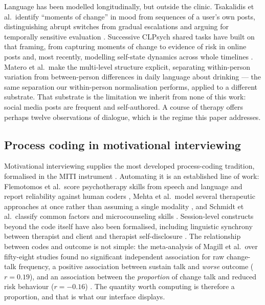 \documentclass[conference]{IEEEtran}
\begin{document}
Language has been modelled longitudinally, but outside the clinic. Tsakalidis
et al.\ identify ``moments of change'' in mood from sequences of a user's own
posts, distinguishing abrupt switches from gradual escalations and arguing for
temporally sensitive evaluation \cite{tsakalidis2022moments}. Successive
CLPsych shared tasks have built on that framing, from capturing moments of
change \cite{tsakalidis2022} to evidence of risk in online posts
\cite{chim2024} and, most recently, modelling self-state dynamics across whole
timelines \cite{tseriotou2025}. Matero et al.\ make the multi-level structure
explicit, separating within-person variation from between-person differences
in daily language about drinking \cite{matero2024} --- the same separation our
within-person normalisation performs, applied to a different substrate. That
substrate is the limitation we inherit from none of this work: social media
posts are frequent and self-authored. A course of therapy offers perhaps
twelve observations of dialogue, which is the regime this paper addresses.

\subsection{Process coding in motivational interviewing}
Motivational interviewing supplies the most developed process-coding
tradition, formalised in the MITI instrument \cite{moyers2016}. Automating it
is an established line of work: Flemotomos et al.\ score psychotherapy skills
from speech and language and report reliability against human coders
\cite{flemotomos2022}, Mehta et al.\ model several therapeutic approaches at
once rather than assuming a single modality \cite{mehta2022}, and Schmidt et
al.\ classify common factors and microcounseling skills \cite{schmidt2025}.
Session-level constructs beyond the code itself have also been formalised,
including linguistic synchrony between therapist and client
\cite{shapira2022} and therapist self-disclosure \cite{shapira2024}. The
relationship between codes and outcome is not simple: the meta-analysis of
Magill et al.\ over fifty-eight studies found no significant independent
association for raw change-talk frequency, a positive association between
sustain talk and \emph{worse} outcome ($r=0.19$), and an association between
the \emph{proportion} of change talk and reduced risk behaviour ($r=-0.16$)
\cite{magill2018}. The quantity worth computing is therefore a proportion, and
that is what our interface displays.
\end{document}
